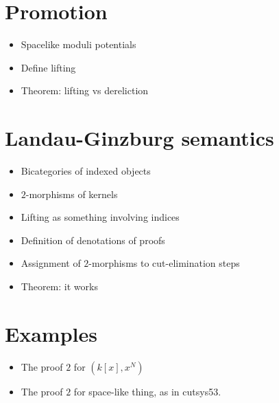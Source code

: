 \documentclass[english,letter paper,12pt,reqno]{article}
\theoremstyle{example}
\numberwithin{equation}{section}
\begin{document}
\section{Promotion}

\begin{itemize}
\item Spacelike moduli potentials
\item Define lifting
\item Theorem: lifting vs dereliction
\end{itemize}

\section{Landau-Ginzburg semantics}

\begin{itemize}
\item Bicategories of indexed objects
\item $2$-morphisms of kernels
\item Lifting as something involving indices
\item Definition of denotations of proofs
\item Assignment of $2$-morphisms to cut-elimination steps
\item Theorem: it works
\end{itemize}

\section{Examples}

\begin{itemize}
\item The proof $2$ for $(k[x],x^N)$
\item The proof $2$ for space-like thing, as in cutsys53.
\end{itemize}

\end{document}
